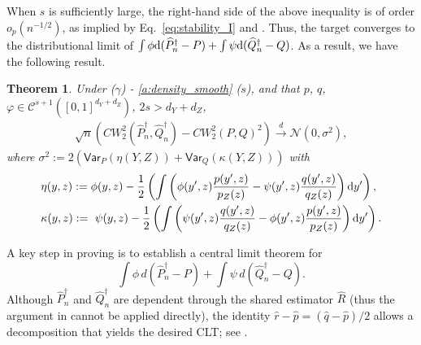 \documentclass{article}
\theoremstyle{plain}
\newtheorem{theorem}{Theorem}[section]
\theoremstyle{definition}
\def\PP{P}
\def\QQ{Q}
\def\var{\mathsf{Var}}
\theoremstyle{plain}
\def \var {\mathsf{Var}}
\newcommand{\diff}{{\rm d}}
\def\var{\mathsf{Var}}
\newcommand{\Cwass}{{CW}}
\begin{document}
When $s$ is sufficiently large, the right-hand side of the above inequality is of order $o_p(n^{-1/2})$, as implied by Eq.~\eqref{eq:stability_I} and . Thus, the target converges to the distributional limit of $\int \phi \diff (\widehat P_n^{\dagger} - \PP) + \int \psi \diff (\widehat Q_n^{\dagger} - \QQ)$. 
As a result, we have the following result.
\begin{theorem}\label{theo:CLT}
Under  ($\gamma$) - \ref{a:density_smooth} ($s$), and that $p$, $q$, $\varphi \in \mathcal{C}^{s+1}([0,1]^{d_Y+d_Z})$, $2s > d_Y + d_Z$,
    \begin{align*}
         \sqrt{n}\left(\Cwass^2_2(\widehat \PP_n^\dagger,\widehat \QQ^\dagger_n) - \Cwass^2_2(\PP,\QQ)^2 \right) 
         \stackrel{d}{\to}
         \mathcal N(0, \sigma^2),
    \end{align*}
    where $\sigma^2 := 2 \left(\var_{\PP}(\eta(Y,Z))+\var_{\QQ}(\kappa(Y,Z))\right)$ with
    \begin{align*}
        &\eta(y,z):=\phi(y,z)
        -\frac{1}{2}\left(\int\left(\phi(y',z) \frac{p(y',z)}{p_Z(z)}-\psi(y',z) \frac{q(y',z)}{q_Z(z)}\right) \diff y'\right), \\
        &\kappa(y,z):=~\psi(y,z)
        -\frac{1}{2}\left(\int\left(\psi(y',z) \frac{q(y',z)}{q_Z(z)}-\phi(y',z) \frac{p(y',z)}{p_Z(z)}\right) \diff y'\right).
    \end{align*}
\end{theorem}

A key step in proving  is to establish a central limit theorem for
\[
\int \phi \, d(\widehat P_n^{\dagger} - \PP)
+
\int \psi \, d(\widehat Q_n^{\dagger} - \QQ).
\]
Although $\widehat P_n^{\dagger}$ and $\widehat Q_n^{\dagger}$ are dependent through the shared estimator $\widehat R$ (thus the argument in \parencite{manole2023central} cannot be applied directly), the identity
$\widehat r - \widehat p = (\widehat q - \widehat p)/2$
allows a decomposition that yields the desired CLT; see .


\end{document}
